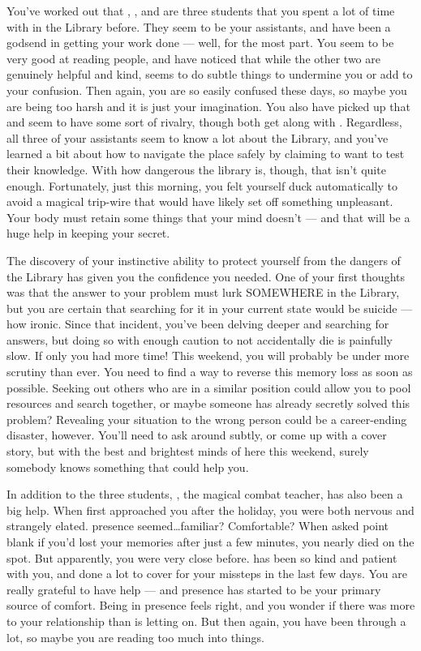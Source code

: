 \documentclass[char]{GL2020}
\begin{document}
You've worked out that \cPresident{\full}, \cLibAssist{\full}, and \cAmbition{\full} are three students that you spent a lot of time with in the Library before. They seem to be your assistants, and have been a godsend in getting your work done — well, for the most part. You seem to be very good at reading people, and have noticed that while the other two are genuinely helpful and kind, \cLibAssist{} seems to do subtle things to undermine you or add to your confusion. Then again, you are so easily confused these days, so maybe you are being too harsh and it is just your imagination. You also have picked up that \cLibAssist{} and \cAmbition{} seem to have some sort of rivalry, though both get along with \cPresident{}. Regardless, all three of your assistants seem to know a lot about the Library, and you've learned a bit about how to navigate the place safely by claiming to want to test their knowledge. With how dangerous the library is, though, that isn't quite enough. Fortunately, just this morning, you felt yourself duck automatically to avoid a magical trip-wire that would have likely set off something unpleasant. Your body must retain some things that your mind doesn't — and that will be a huge help in keeping your secret.

The discovery of your instinctive ability to protect yourself from the dangers of the Library has given you the confidence you needed. One of your first thoughts was that the answer to your problem must lurk SOMEWHERE in the Library, but you are certain that searching for it in your current state would be suicide — how ironic. Since that incident, you've been delving deeper and searching for answers, but doing so with enough caution to not accidentally die is painfully slow. If only you had more time! This weekend, you will probably be under more scrutiny than ever. You need to find a way to reverse this memory loss as soon as possible. Seeking out others who are in a similar position could allow you to pool resources and search together, or maybe someone has already secretly solved this problem? Revealing your situation to the wrong person could be a career-ending disaster, however. You'll need to ask around subtly, or come up with a cover story, but with the best and brightest minds of \pEarth{} here this weekend, surely somebody knows something that could help you.

In addition to the three students, \cInterpol{\full}, the magical combat teacher, has also been a big help. When \cInterpol{\they} first approached you after the holiday, you were both nervous and strangely elated. \cInterpol{\Their} presence seemed…familiar? Comfortable? When \cInterpol{\they} asked point blank if you'd lost your memories after just a few minutes, you nearly died on the spot. But apparently, you were very close before. \cInterpol{} has been so kind and patient with you, and done a lot to cover for your missteps in the last few days. You are really grateful to have \cInterpol{\their} help — and \cInterpol{\their} presence has started to be your primary source of comfort. Being in \cInterpol{\their} presence feels right, and you wonder if there was more to your relationship than \cInterpol{} is letting on. But then again, you have been through a lot, so maybe you are reading too much into things. 
\end{document}
